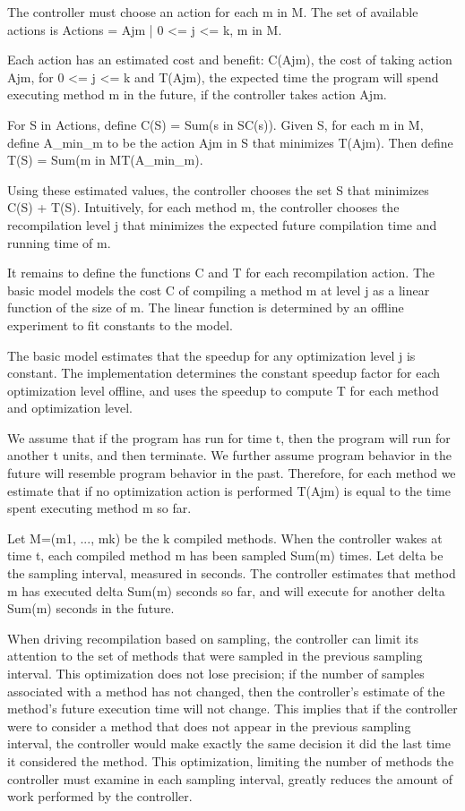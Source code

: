 The controller must choose an action for each m in M. The set of available actions is Actions = {Ajm | 0 <= j <= k, m in M}.

Each action has an estimated cost and benefit: C(Ajm), the cost of taking action Ajm, for 0 <= j <= k and T(Ajm), the expected time the program will spend executing method m in the future, if the controller takes action Ajm.

For S in Actions, define C(S) = Sum({s in S}C(s)). Given S, for each m in M, define A_min_m to be the action Ajm in S that minimizes T(Ajm).  Then define T(S) = Sum({m in M}T(A_{min}_m).

Using these estimated values, the controller chooses the set S that minimizes C(S) + T(S). Intuitively, for each method m, the controller chooses the recompilation level j that minimizes the expected future compilation time and running time of m.

It remains to define the functions C and T for each recompilation action. The basic model models the cost C of compiling a method m at level j as a linear function of the size of m. The linear function is determined by an offline experiment to fit constants to the model.

The basic model estimates that the speedup for any optimization level j is constant. The implementation determines the constant speedup factor for each optimization level offline, and uses the speedup to compute T for each method and optimization level.

We assume that if the program has run for time t, then the program will run for another t units, and then terminate. We further assume program behavior in the future will resemble program behavior in the past. Therefore, for each method we estimate that if no optimization action is performed T(Ajm) is equal to the time spent executing method m so far.

Let M=(m1, ..., mk) be the k compiled methods. When the controller wakes at time t, each compiled method m has been sampled Sum(m) times. Let delta be the sampling interval, measured in seconds. The controller estimates that method m has executed delta Sum(m) seconds so far, and will execute for another delta Sum(m) seconds in the future.

When driving recompilation based on sampling, the controller can limit its attention to the set of methods that were sampled in the previous sampling interval. This optimization does not lose precision; if the number of samples associated with a method has not changed, then the controller's estimate of the method's future execution time will not change. This implies that if the controller were to consider a
method that does not appear in the previous sampling interval, the controller would make exactly the same decision it did the last time it considered the method. This optimization, limiting the number of methods the controller must examine in each sampling interval, greatly reduces the amount of work performed by the controller.

